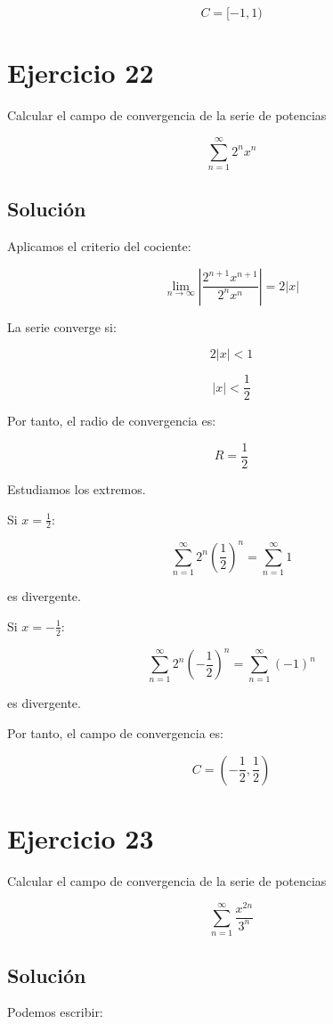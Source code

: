 \documentclass[fleqn]{article}
\begin{document}
	\[
	\boxed{
	C=[-1,1)
	}
	\]

\section{Ejercicio 22}
	Calcular el campo de convergencia de la serie de potencias

	\[
	\sum_{n=1}^{\infty}2^n x^n
	\]

	\subsection{Solución}

	Aplicamos el criterio del cociente:

	\[
	\lim_{n\to\infty}
	\left|
	\frac{2^{n+1}x^{n+1}}{2^n x^n}
	\right|
	=
	2|x|
	\]

	La serie converge si:

	\[
	2|x|<1
	\]

	\[
	|x|<\frac{1}{2}
	\]

	Por tanto, el radio de convergencia es:

	\[
	\boxed{
	R=\frac{1}{2}
	}
	\]

	Estudiamos los extremos.

	Si $x=\frac{1}{2}$:

	\[
	\sum_{n=1}^{\infty}
	2^n\left(\frac{1}{2}\right)^n
	=
	\sum_{n=1}^{\infty}1
	\]

	es divergente.

	Si $x=-\frac{1}{2}$:

	\[
	\sum_{n=1}^{\infty}
	2^n\left(-\frac{1}{2}\right)^n
	=
	\sum_{n=1}^{\infty}(-1)^n
	\]

	es divergente.

	Por tanto, el campo de convergencia es:

	\[
	\boxed{
	C=\left(-\frac{1}{2},\frac{1}{2}\right)
	}
	\]

\section{Ejercicio 23}
	Calcular el campo de convergencia de la serie de potencias

	\[
	\sum_{n=1}^{\infty}\frac{x^{2n}}{3^n}
	\]

	\subsection{Solución}

	Podemos escribir:
\end{document}
